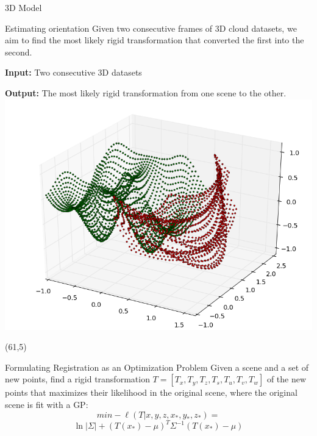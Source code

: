 \documentclass[final]{beamer}
\begin{document}
\begin{frame}{}
\begin{textblock}{27.5}
\begin{block}{3D Model}
\end{block}

\begin{block}{Estimating orientation}
Given two consecutive frames of 3D cloud datasets, we aim to find the most likely rigid transformation that converted the first into the second.

\textbf{Input:} Two consecutive 3D datasets

\textbf{Output:} The most likely rigid transformation from one scene to the other.
\includegraphics[width=10in]{3DWorldModel.png}
\end{block}

\end{textblock}

\begin{textblock}{27}(61,5)




\begin{block}{Formulating Registration as an Optimization Problem}
Given a scene and a set of new points, find a rigid transformation $T = [T_x,T_y,T_z,T_s,T_u,T_v,T_w]$ of the new points 
that maximizes their likelihood in the original scene, where the original scene is fit with a GP:
$$min -\ell(T|x,y,z,x_*,y_*,z_*) =$$
$$ \ln|\Sigma| + (T(x_*) - \mu)^T \Sigma^{-1} (T(x_*) - \mu)$$

\end{block}



\end{textblock}
\end{frame}
\end{document}
